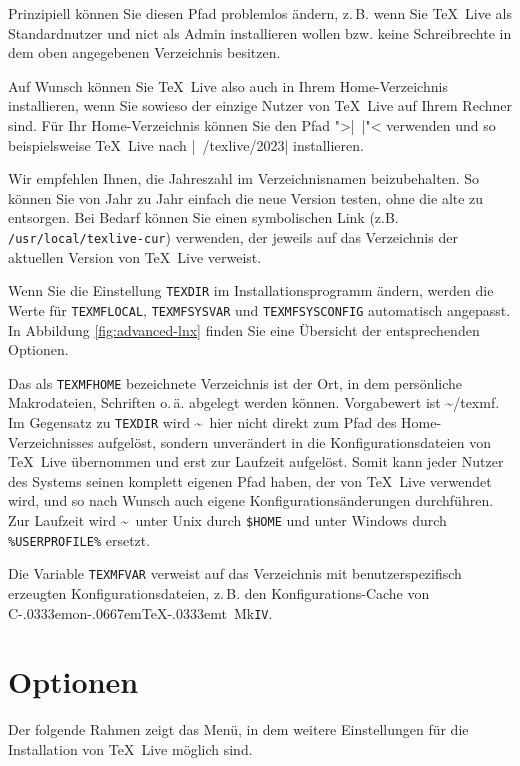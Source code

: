 \documentclass[12pt,ngerman,a4paper,fullparskip]{scrreprt}
\newcommand{\TL}{\TeX\ Live\xspace}
\newcommand{\acro}[1]{\texttt{#1}}
\newcommand{\dirname}[1]{\texttt{#1}}
\newcommand\ConTeXt{C\kern-.0333emon\-\kern-.0667em\TeX\kern-.0333emt}
\begin{document}
Prinzipiell können Sie diesen Pfad problemlos ändern, z.\,B. wenn Sie \TL als Standardnutzer und nict als Admin installieren wollen bzw. keine Schreibrechte in dem oben angegebenen Verzeichnis besitzen.

Auf Wunsch können Sie \TL also auch in Ihrem Home-Verzeichnis installieren, wenn Sie sowieso der einzige Nutzer von \TL auf Ihrem Rechner sind. Für Ihr Home-Verzeichnis können Sie den Pfad ">|~|"< verwenden und so beispielsweise \TL nach  |~/texlive/2023| installieren.

Wir empfehlen Ihnen, die Jahreszahl im Verzeichnisnamen beizubehalten. So können Sie von Jahr zu Jahr einfach die neue Version testen, ohne die alte zu entsorgen. Bei Bedarf können Sie einen symbolischen
Link (z.B. \dirname{/usr/local/texlive-cur}) verwenden, der jeweils auf das Verzeichnis der aktuellen Version von \TL verweist.

Wenn Sie die Einstellung \dirname{TEXDIR} im Installationsprogramm ändern, werden die Werte für
\dirname{TEXMFLOCAL}, \dirname{TEXMFSYSVAR} und \dirname{TEXMFSYSCONFIG} automatisch angepasst. In Abbildung \ref{fig:advanced-lnx} finden Sie eine Übersicht der entsprechenden Optionen.

Das als \dirname{TEXMFHOME} bezeichnete Verzeichnis ist der Ort, in dem persönliche Makrodateien,
Schriften o.\,ä. abgelegt werden können. Vorgabewert ist \textasciitilde/texmf. Im Gegensatz zu \dirname{TEXDIR} wird \textasciitilde\ hier nicht direkt zum Pfad des Home-Verzeichnisses aufgelöst, sondern unverändert in die Konfigurationsdateien von \TL übernommen und erst zur Laufzeit aufgelöst. Somit kann jeder Nutzer des Systems seinen komplett eigenen Pfad haben, der von \TL verwendet wird, und so nach Wunsch auch eigene Konfigurationsänderungen durchführen. Zur Laufzeit wird \textasciitilde\ unter Unix durch \dirname{\$HOME} und unter Windows durch \verb|%USERPROFILE%| ersetzt.

Die Variable \dirname{TEXMFVAR} verweist auf das Verzeichnis mit benutzerspezifisch
erzeugten Konfigurationsdateien, z.\,B. den Konfigurations-Cache von \ConTeXt\ Mk\acro{IV}.

\clearpage

\section{Optionen}\label{sec:options}

Der folgende Rahmen zeigt das Menü, in dem weitere Einstellungen für die Installation von \TL möglich sind.
\end{document}
